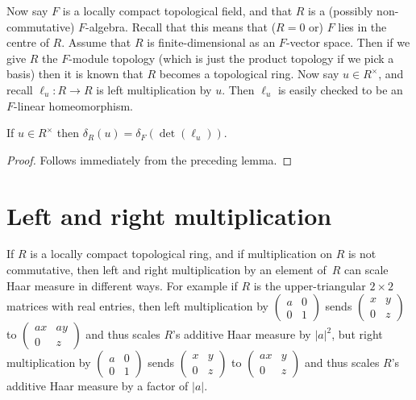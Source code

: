 Now say $F$ is a locally compact topological field, and that $R$ is a (possibly
non-commutative) $F$-algebra. Recall that this means that ($R=0$ or) $F$ lies in the centre of $R$.
Assume that $R$ is finite-dimensional as an $F$-vector space. Then if we give $R$ the
$F$-module topology (which is just the product topology if we pick a basis) then it is known
that $R$ becomes a topological ring. Now say $u\in R^\times$, and
recall $\ell_u:R\to R$ is left multiplication by $u$. Then $\ell_u$ is easily checked to be
an $F$-linear homeomorphism.

  \begin{corollary}
  \label{MeasureTheory.algebra_ringHaarChar_eq_ringHaarChar_det}
  \leanok
  If $u\in R^\times$ then $\delta_R(u)=\delta_F(\det(\ell_u))$.
\end{corollary}
\begin{proof}
  \leanok
  Follows immediately from the preceding lemma.
\end{proof}

\section{Left and right multiplication}

If $R$ is a locally compact topological ring, and if multiplication on $R$ is not commutative,
then left and right multiplication by an element of~$R$ can scale Haar measure in different ways.
For example if $R$ is the upper-triangular $2\times 2$ matrices with real
entries, then left multiplication by $\begin{pmatrix}a&0\\0&1\end{pmatrix}$
sends $\begin{pmatrix}x&y\\0&z\end{pmatrix}$ to $\begin{pmatrix}ax&ay\\0&z\end{pmatrix}$
and thus scales $R$'s additive
Haar measure by $|a|^2$, but right multiplication by $\begin{pmatrix}a&0\\0&1\end{pmatrix}$
sends $\begin{pmatrix}x&y\\0&z\end{pmatrix}$ to $\begin{pmatrix}ax&y\\0&z\end{pmatrix}$
and thus scales $R$'s additive Haar measure by a factor of $|a|$.

